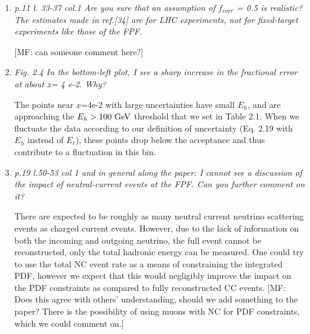 \documentclass[11pt,a4paper]{article}
\begin{document}
\begin{enumerate}
"As pointed out in Ref.~\cite{Kling:2021gos} there are notable neutrino flux uncertainties, as various event generators do not agree on the forward parent hadron spectra. The spread of the generators' predictions can be taken as a means of flux uncertainty, in which case there is a $\lesssim 50\%$ uncertainty on the interacting muon neutrino spectrum --- if left unresolved this would be a significant systematic. Indeed, there are already projections of FPF measurements which would reduce this uncertainty to the sub-percent level~\cite{Kling:2023tgr} as well as efforts to describe the uncertainty in a data-driven way while improving the modelling of forward hadronization~\cite{Fieg:2023kld}. However, it is important to note that forward neutrino experiments actually constrain the product of flux and cross-section, and one must be assumed to measure the other. In a full analysis, they would be constrained simultaneously in a joint measurement. In our study, we aim to understand the full impact of FPF data on the PDF fit, thus motivating this future joint measurement. To this aim, we take the neutrino flux to be known and focus on the irreducible systematics associated with event reconstruction." 

\item{\it p.11 l. 33-37 col.1 Are you sure that an assumption of $f_{corr}$ = 0.5 is realistic? The estimates made in ref.[34] are for LHC experiments, not for fixed-target experiments like those of the FPF.}

{\color{red} [MF: can someone comment here?]}

\item{\it  Fig. 2.4 In the bottom-left plot, I see a sharp increase in the fractional error at about x= 4 e-2. Why?}

The points near $x$=4e-2 with large uncertainties have small $E_h$, and are approaching the $E_h>100~ {\rm GeV}$ threshold that we set in Table 2.1. When we fluctuate the data according to our definition of uncertainty (Eq. 2.19 with $E_h$ instead of $E_{\ell}$), these points drop below the acceptance and thus contribute to a fluctuation in this bin.

\item{\it p.19 l.50-53 col 1 and in general along the paper: I cannot see a discussion of the impact of neutral-current events at the FPF. Can you further comment on it?}

There are expected to be roughly as many neutral current neutrino scattering events as charged current events. However, due to the lack of information on both the incoming and outgoing neutrino, the full event cannot be reconstructed, only the total hadronic energy can be measured. One could try to use the total NC event rate as a means of constraining the integrated PDF, however we expect that this would negligibly improve the impact on the PDF constraints as compared to fully reconstructed CC events. {\color{red} [MF: Does this agree with others' understanding, should we add something to the paper? There is the possibility of using muons with NC for PDF constraints, which we could comment on.]}


\end{enumerate}
	
\end{document}

